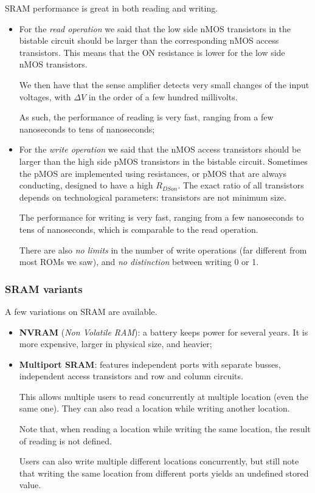 \documentclass[a4paper,11pt]{article}
\begin{document}
SRAM performance is great in both reading and writing.

\begin{itemize}
	\item For the \textit{read operation} we said that the low side nMOS transistors in the bistable circuit should be larger than the corresponding nMOS access transistors.
	      This means that the ON resistance is lower for the low side nMOS transistors.

	      We then have that the sense amplifier detects very small changes of the input voltages, with $\Delta V$ in the order of a few hundred millivolts.

	      As such, the performance of reading is very fast, ranging from a few nanoseconds to tens of nanoseconds;

	\item For the \textit{write operation} we said that the nMOS access transistors should be larger than the high side pMOS transistors in the bistable circuit.
	      Sometimes the pMOS are implemented using resistances, or pMOS that are always conducting, designed to have a high $R_{DSon}$.
	      The exact ratio of all transistors depends on technological parameters: transistors are not minimum size.

	      The performance for writing is very fast, ranging from a few nanoseconds to tens of nanoseconds, which is comparable to the read operation.

	      There are also \textit{no limits} in the number of write operations (far different from most ROMs we saw), and \textit{no distinction} between writing 0 or 1.
\end{itemize}

\subsubsection{SRAM variants}

A few variations on SRAM are available.
\begin{itemize}
	\item \textbf{NVRAM} (\textit{Non Volatile RAM}): a battery keeps power for several years. It is more expensive, larger in physical size, and heavier;
	\item \textbf{Multiport SRAM}: features independent ports with separate busses, independent access transistors and row and column circuits.

	      This allows multiple users to read concurrently at multiple location (even the same one).
	      They can also read a location while writing another location.

	      Note that, when reading a location while writing the same location, the result of reading is not defined.

	      Users can also write multiple different locations concurrently, but still note that writing the same location from different ports yields an undefined stored value.
\end{itemize}
\end{document}
